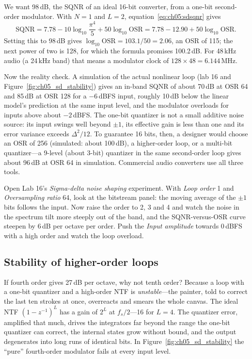 \begin{worked}
We want 98\,dB, the SQNR of an ideal 16-bit converter, from a one-bit second-order modulator.
With $N=1$ and $L=2$, equation~\eqref{eq:ch05:sdsqnr} gives
\[
\text{SQNR}=7.78-10\log_{10}\frac{\pi^4}{5}+50\log_{10}\mathrm{OSR}
=7.78-12.90+50\log_{10}\mathrm{OSR}.
\]
Setting this to 98\,dB gives $\log_{10}\mathrm{OSR}=103.1/50=2.06$, an OSR of 115; the next power
of two is 128, for which the formula promises 100.2\,dB. For 48\,kHz audio (a 24\,kHz band) that
means a modulator clock of $128\times48=6.144$\,MHz.

Now the reality check. A simulation of the actual nonlinear loop (lab 16 and
Figure~\ref{fig:ch05_sd_stability}) gives an in-band SQNR of about 70\,dB at OSR 64 and 85\,dB at
OSR 128 for a $-6$\,dBFS input, roughly 10\,dB below the linear model's prediction at the same
input level, and the modulator overloads for inputs above about $-2$\,dBFS. The one-bit quantizer
is not a small additive noise source: its input swings well beyond $\pm1$, its effective gain is
less than one and its error variance exceeds $\Delta^2/12$. To guarantee 16 bits, then, a designer
would choose an OSR of 256 (simulated: about 100\,dB), a higher-order loop, or a multi-bit
quantizer---a 9-level (about 3-bit) quantizer in the same second-order loop gives about 96\,dB at
OSR 64 in simulation. Commercial audio converters use all three tools.
\end{worked}

\begin{tryit}
Open Lab 16's \emph{Sigma-delta noise shaping} experiment. With \emph{Loop order} 1 and
\emph{Oversampling ratio} 64, look at the bitstream panel: the moving average of the $\pm1$ bits
follows the input. Now raise the order to 2, 3 and 4 and watch the noise in the spectrum tilt more
steeply out of the band, and the SQNR-versus-OSR curve steepen by 6\,dB per octave per order. Push
the \emph{Input amplitude} towards 0\,dBFS with a high order and watch the loop overload.
\end{tryit}

\subsection{Stability of higher-order loops}

If fourth order gives 27\,dB per octave, why not tenth order? Because a loop with a one-bit
quantizer and a high-order NTF is \emph{unstable}---the painter, told to correct the last ten
strokes at once, overreacts and smears the whole canvas. The ideal NTF $(1-z^{-1})^L$ has a gain of
$2^L$ at $f_s/2$---16 for $L=4$. The quantizer error, amplified that much, drives the
integrators far beyond the range the one-bit quantizer can correct, the internal states grow
without bound, and the output degenerates into long runs of identical bits. In
Figure~\ref{fig:ch05_sd_stability} the ``pure'' fourth-order modulator fails at every input
level.

